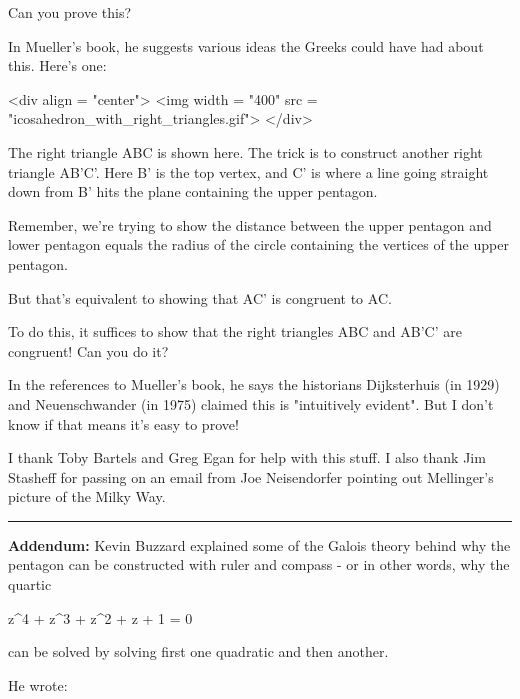Can you prove this?

In Mueller's book, he suggests various ideas the Greeks could
have had about this.  Here's one:

<div align = "center">
<img width = "400" src = "icosahedron_with_right_triangles.gif">
</div>

The right triangle ABC is shown here.  The trick is to construct
another right triangle AB'C'.  Here B' is the top vertex, and C'
is where a line going straight down from B' hits the plane
containing the upper pentagon.

Remember, we're trying to show the distance 
between the upper pentagon and lower pentagon 
equals the radius of the circle containing the
vertices of the upper pentagon.

But that's equivalent to showing that AC' is congruent to AC.

To do this, it suffices to show that the right triangles ABC
and AB'C' are congruent!  Can you do it?

In the references to Mueller's book, he says the historians
Dijksterhuis (in 1929) and Neuenschwander (in 1975) claimed this
is "intuitively evident".  But I don't know if that means
it's easy to prove!

I thank Toby Bartels and Greg Egan for help with this stuff.
I also thank Jim Stasheff for passing on an email from Joe
Neisendorfer pointing out Mellinger's picture of the Milky Way.

\par\noindent\rule{\textwidth}{0.4pt}

\textbf{Addendum:} Kevin Buzzard explained some of the Galois theory
behind why the pentagon can be constructed with ruler and compass -
or in other words, why the quartic 

z^{4} + z^{3} + z^{2} + z + 1 = 0

can be solved by solving first one quadratic and then another.

He wrote:

